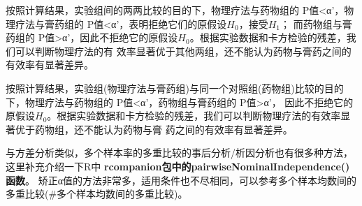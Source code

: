 \documentclass[
]{article}
\newenvironment{Shaded}{\begin{snugshade}}{\end{snugshade}}
\newcommand{\CommentTok}[1]{\textcolor[rgb]{0.56,0.35,0.01}{\textit{#1}}}
\newcommand{\DataTypeTok}[1]{\textcolor[rgb]{0.13,0.29,0.53}{#1}}
\newcommand{\KeywordTok}[1]{\textcolor[rgb]{0.13,0.29,0.53}{\textbf{#1}}}
\newcommand{\NormalTok}[1]{#1}
\newcommand{\OperatorTok}[1]{\textcolor[rgb]{0.81,0.36,0.00}{\textbf{#1}}}
\begin{document}
\begin{Shaded}
\end{Shaded}

按照计算结果，实验组间的两两比较的目的下，物理疗法与药物组的 P值\textless α'，物理疗法与膏药组的 P值\textless α'，表明拒绝它们的原假设\(H_0\)，接受\(H_1\)；
而药物组与膏药组的 P值\textgreater α'，因此不拒绝它的原假设\(H_0\)。根据实验数据和卡方检验的残差，我们可以判断物理疗法的有
效率显著优于其他两组，还不能认为药物与膏药之间的有效率有显著差异。

按照计算结果，实验组(物理疗法与膏药组)与同一个对照组(药物组)比较的目的下，物理疗法与药物组的 P值\textless α'，药物组与膏药组的 P值\textgreater α'，
因此不拒绝它的原假设\(H_0\)。根据实验数据和卡方检验的残差，我们可以判断物理疗法的有效率显著优于药物组，还不能认为药物与膏
药之间的有效率有显著差异。

与方差分析类似，多个样本率的多重比较的事后分析/析因分析也有很多种方法，这里补充介绍一下R中
\textbf{rcompanion包中的pairwiseNominalIndependence()函数}。
矫正α值的方法非常多，适用条件也不尽相同，可以参考多个样本均数间的多重比较(\#多个样本均数间的多重比较)。
\end{document}
